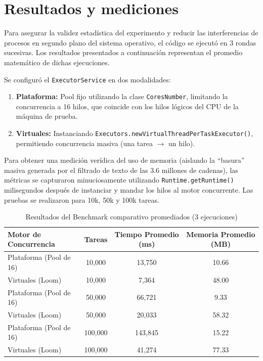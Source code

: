 \documentclass[12pt,a4paper]{article}
\begin{document}
\section{Resultados y mediciones}
Para asegurar la validez estadística del experimento y reducir las interferencias de procesos en segundo plano del sistema operativo, el código se ejecutó en 3 rondas sucesivas. Los resultados presentados a continuación representan el promedio matemático de dichas ejecuciones.

Se configuró el \texttt{ExecutorService} en dos modalidades:
\begin{enumerate}
    \item \textbf{Plataforma:} Pool fijo utilizando la clase \texttt{CoresNumber}, limitando la concurrencia a 16 hilos, que coincide con los hilos lógicos del CPU de la máquina de prueba.
    \item \textbf{Virtuales:} Instanciando \texttt{Executors.newVirtualThreadPerTaskExecutor()}, permitiendo concurrencia masiva (una tarea $\rightarrow$ un hilo).
\end{enumerate}

Para obtener una medición verídica del uso de memoria (aislando la ``basura'' masiva generada por el filtrado de texto de las 3.6 millones de cadenas), las métricas se capturaron minuciosamente utilizando \texttt{Runtime.getRuntime()} milisegundos después de instanciar y mandar los hilos al motor concurrente. Las pruebas se realizaron para 10k, 50k y 100k tareas.

\begin{table}[H]
\centering
\begin{tabular}{@{}lccc@{}}
\toprule
\textbf{Motor de Concurrencia} & \textbf{Tareas} & \textbf{Tiempo Promedio (ms)} & \textbf{Memoria Promedio (MB)} \\ \midrule
Plataforma (Pool de 16)      & 10,000          & 13,750                            & 10.66                       \\
Virtuales (Loom)             & 10,000          & 7,364                             & 48.00                       \\ \midrule
Plataforma (Pool de 16)      & 50,000          & 66,721                            & 9.33                        \\
Virtuales (Loom)             & 50,000          & 20,033                            & 58.32                       \\ \midrule
Plataforma (Pool de 16)      & 100,000         & 143,845                           & 15.22                       \\
Virtuales (Loom)             & 100,000         & 41,274                            & 77.33                       \\ \bottomrule
\end{tabular}
\caption{Resultados del Benchmark comparativo promediados (3 ejecuciones)}
\end{table}
\end{document}
